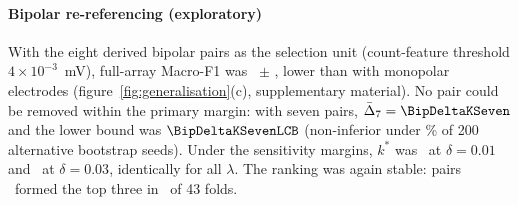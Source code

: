 \paragraph{Bipolar re-referencing (exploratory)} With the eight derived bipolar pairs as the selection unit (count-feature threshold $4 \times 10^{-3}$~mV), full-array Macro-F1 was \BipFull\ $\pm$ \BipFullSD, lower than with monopolar electrodes (figure~\ref{fig:generalisation}(c), supplementary material). No pair could be removed within the primary margin: with seven pairs, $\bar\Delta_7 = \BipDeltaKSeven$ and the lower bound was $\BipDeltaKSevenLCB$ (non-inferior under \BipSeedFracSeven\% of 200 alternative bootstrap seeds). Under the sensitivity margins, $k^*$ was \BipKStarMarginPtOne\ at $\delta = 0.01$ and \BipKStarMarginPtThree\ at $\delta = 0.03$, identically for all $\lambda$. The ranking was again stable: pairs \BipTopThreeSet\ formed the top three in \BipTopThreeFolds\ of 43 folds.
